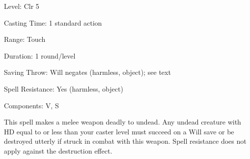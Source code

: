 
\begin{description*}
\item[Level:] Clr 5
\item[Casting Time:] 1 standard action
\item[Range:] Touch
\item[Duration:] 1 round/level
\item[Saving Throw:] Will negates (harmless, object); see text
\item[Spell Resistance:] Yes (harmless, object)
\item[Components:] V, S
\end{description*}

This spell makes a melee weapon deadly to undead. Any undead creature with HD equal
to or less than your caster level must succeed on a Will save or be destroyed utterly
if struck in combat with this weapon. Spell resistance does not apply against the
destruction effect.